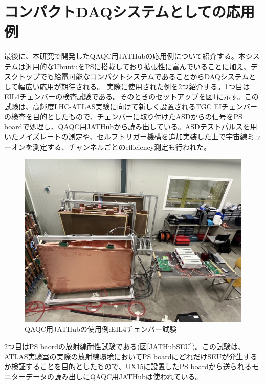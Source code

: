 \section{コンパクトDAQシステムとしての応用例}
\label{sec_compactdaq}
最後に、本研究で開発したQAQC用JATHubの応用例について紹介する。本システムは汎用的なUbuntuをPSに搭載しており拡張性に富んでいることに加え、デスクトップでも給電可能なコンパクトシステムであることからDAQシステムとして幅広い応用が期待される。
実際に使用された例を2つ紹介する。1つ目はEIL4チェンバーの検査試験である。そのときのセットアップを図\ref{JATHubEIL4}に示す。この試験は、高輝度LHC-ATLAS実験に向けて新しく設置されるTGC EIチェンバーの検査を目的としたもので、チェンバーに取り付けたASDからの信号をPS boardで処理し、QAQC用JATHubから読み出している。ASDテストパルスを用いたノイズレートの測定や、セルフトリガー機構を追加実装した上で宇宙線ミューオンを測定する、チャンネルごとのefficiency測定も行われた。
\baselineskip

\begin{figure}
\centering
\includegraphics[width=16cm]{fig/QAQC/JATHubEIL4.JPG}
\caption[QAQC用JATHubの使用例:EIL4チェンバー試験]{QAQC用JATHubの使用例:EIL4チェンバー試験\cite{mt_wada}}
\label{JATHubEIL4}
\end{figure}

2つ目はPS baordの放射線耐性試験である(図\ref{JATHubSEU})。この試験は、ATLAS実験室の実際の放射線環境においてPS boardにどれだけSEUが発生するか検証することを目的としたもので、UX15に設置したPS boardから送られるモニターデータの読み出しにQAQC用JATHubは使われている。


